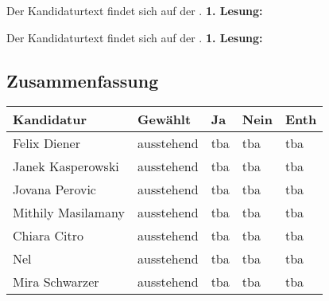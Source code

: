 {
    Der Kandidaturtext findet sich auf der \kandidaturenseite.
}
{
    \textbf{1. Lesung:}
    \ul{
        \ul{}
    }
}

{
    Der Kandidaturtext findet sich auf der \kandidaturenseite.
}
{
    \textbf{1. Lesung:}
}

\subsection{Zusammenfassung}
\begin{center}
    \begin{tabular}{|p{6cm}|m{2cm}|m{1cm}|m{1cm}|m{1cm}|}
        \hline
        Kandidatur & Gewählt & Ja & Nein & Enth\\\hline
        Felix Diener & ausstehend & tba & tba & tba\\\hline
        Janek Kasperowski & ausstehend & tba & tba & tba\\\hline
        Jovana Perovic & ausstehend & tba & tba & tba\\\hline
        Mithily Masilamany & ausstehend & tba & tba & tba\\\hline
        Chiara Citro & ausstehend & tba & tba & tba\\\hline
        Nel & ausstehend & tba & tba & tba\\\hline
        Mira Schwarzer & ausstehend & tba & tba & tba\\\hline
    \end{tabular}
\end{center}